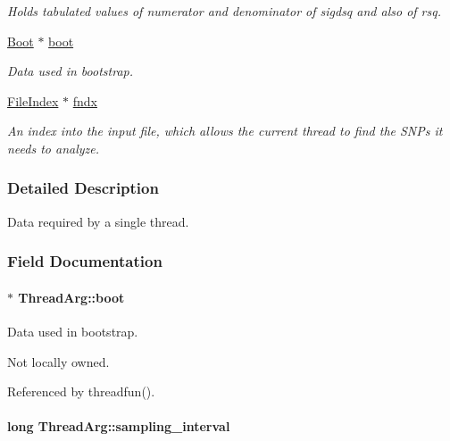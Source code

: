 \begin{DoxyCompactItemize}
\begin{DoxyCompactList}\small\item\em Holds tabulated values of numerator and denominator of sigdsq and also of rsq. \end{DoxyCompactList}\item 
\hyperlink{struct_boot}{Boot} $\ast$ \hyperlink{struct_thread_arg_aab899376a7a5c492cec323d9e5728ac2}{boot}
\begin{DoxyCompactList}\small\item\em Data used in bootstrap. \end{DoxyCompactList}\item 
\hypertarget{struct_thread_arg_a28bf9b11f7f26d007a926ecce5d06e89}{\hyperlink{struct_file_index}{File\+Index} $\ast$ \hyperlink{struct_thread_arg_a28bf9b11f7f26d007a926ecce5d06e89}{fndx}}\label{struct_thread_arg_a28bf9b11f7f26d007a926ecce5d06e89}

\begin{DoxyCompactList}\small\item\em An index into the input file, which allows the current thread to find the S\+N\+Ps it needs to analyze. \end{DoxyCompactList}\end{DoxyCompactItemize}


\subsubsection{Detailed Description}
Data required by a single thread. 

\subsubsection{Field Documentation}
\hypertarget{struct_thread_arg_aab899376a7a5c492cec323d9e5728ac2}{
\paragraph[{boot}]{$\ast$ Thread\+Arg\+::boot}}\label{struct_thread_arg_aab899376a7a5c492cec323d9e5728ac2}


Data used in bootstrap. 

Not locally owned. 

Referenced by threadfun().

\hypertarget{struct_thread_arg_ac82e3148f3f1efd2ad66f235afd1f5e5}{
\paragraph[{sampling\+\_\+interval}]{\setlength{\rightskip}{0pt plus 5cm}long Thread\+Arg\+::sampling\+\_\+interval}}\label{struct_thread_arg_ac82e3148f3f1efd2ad66f235afd1f5e5}


